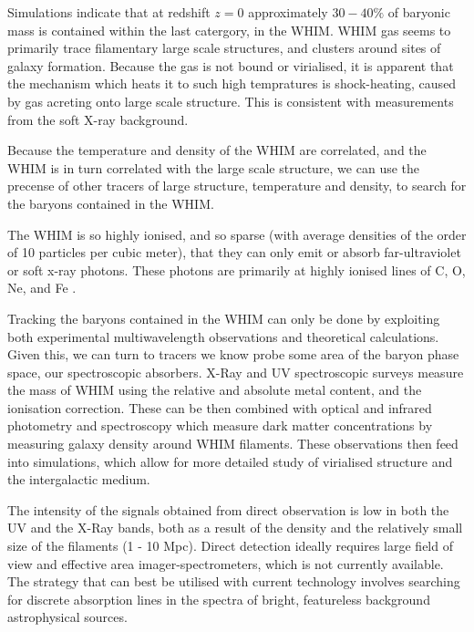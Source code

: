 Simulations \citep{1999ApJ...514....1C,2001ApJ...552..473D} indicate that at redshift $z=0$ approximately $30-40\%$ of baryonic mass is contained within the last catergory, in the WHIM. WHIM gas seems to primarily trace filamentary large scale structures, and clusters around sites of galaxy formation. Because the gas is not bound or virialised, it is apparent that the mechanism which heats it to such high tempratures is shock-heating, caused by gas acreting onto large scale structure. This is consistent with measurements from the soft X-ray background.

\par Because the temperature and density of the WHIM are correlated, and the WHIM is in turn correlated with the large scale structure, we can use the precense of other tracers of large structure, temperature and density, to search for the baryons contained in the WHIM.

\par The WHIM is so highly ionised, and so sparse (with average densities of the order of 10 particles per cubic meter), that they can only emit or absorb far-ultraviolet or soft x-ray photons. These photons are primarily at highly ionised lines of C, O, Ne, and Fe \citep{2006ApJ...650..573C}.

\par Tracking the baryons contained in the WHIM can only be done by exploiting both experimental multiwavelength observations and theoretical calculations. Given this, we can turn to tracers we know probe some area of the baryon phase space, our spectroscopic absorbers. X-Ray and UV spectroscopic surveys measure the mass of WHIM using the relative and absolute metal content, and the ionisation correction. These can be then combined with optical and infrared photometry and spectroscopy which measure dark matter concentrations by measuring galaxy density around WHIM filaments. These observations then feed into simulations, which allow for more detailed study of virialised structure and the intergalactic medium.

\par The intensity of the signals obtained from direct observation is low in both the UV and the X-Ray bands, both as a result of the density and the relatively small size of the filaments (1 - 10 Mpc). Direct detection ideally requires large field of view and effective area imager-spectrometers, which is not currently available. The strategy that can best be utilised with current technology involves searching for discrete absorption lines in the spectra of bright, featureless background astrophysical sources. 


